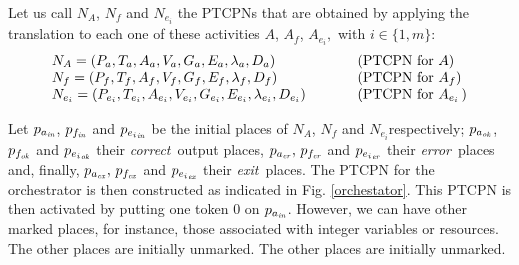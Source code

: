 Let us call $N_A$, $N_{f}$ and $N_{e_i}$ the PTCPNs that
are obtained by applying the translation to each one of these
activities $A$, $A_f$, $A_{e_{i}},$ with $i\in\{1,m\}$:
%
\[
\begin{array}{lll}
N_A = (P_a, T_a, A_a, V_a, G_a, E_a, \lambda_a, D_a) &
\hspace*{0.6cm} & {\rm
(PTCPN~for~}A)\\
N_f = (P_f, T_f, A_f, V_f, G_f, E_f, \lambda_f, D_f)  &
\ & {\rm (PTCPN~for~}A_f)\\
N_{e_i} = (P_{e_i}, T_{e_i}, A_{e_i}, V_{e_i}, G_{e_i}, 
E_{e_i}, \lambda_{e_i}, D_{e_i})  &
\ & {\rm (PTCPN~for~}A_{e_i}\,)
\end{array}
\]

Let $p_{a_{\it in}}$, $p_{f_{\it in}}$ and $p_{{e_i}_{\it in}}$ be the initial places of
$N_A$, $N_f$ and $N_{e_i}$respectively; $p_{a_{\it ok}}$, $p_{f_{\it ok}}$ and $p_{{e_i}_{\it ok}}$ their {\em correct}\, output places, $p_{a_{\it er}},\, p_{f_{\it
er}}$ and $p_{{e_i}_{\it er}}$ their {\em error}\, places and, finally, $p_{a_{\it ex}},\, p_{f_{\it ex}}$ and $p_{{e_i}_{\it ex}}$ their {\em exit}\, places. The PTCPN for the
orchestrator is then constructed as indicated in Fig. \ref{orchestator}. This PTCPN is then activated by putting one token
$0$ on $p_{a_{\it in}}$. However, we can have other marked places, 
for instance, those associated with integer
variables or resources. The other places are initially unmarked.
%
%
%
%
%
%
%
The other places are initially unmarked.

